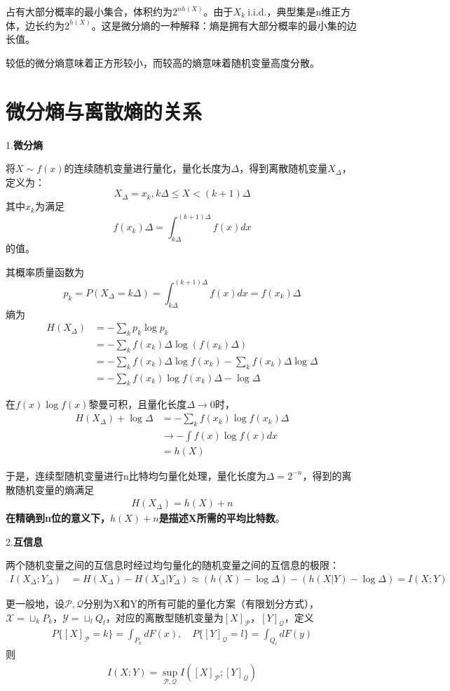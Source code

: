 \documentclass{ctexbook}
\begin{document}
占有大部分概率的最小集合，体积约为$2^{nh(X)}$。由于$X_k\ $i.i.d.，典型集是n维正方体，边长约为$2^{h(X)}$。这是微分熵的一种解释：熵是拥有大部分概率的最小集的边长值。

较低的微分熵意味着正方形较小，而较高的熵意味着随机变量高度分散。

\section{微分熵与离散熵的关系}

1.\textbf{微分熵}

将$X\sim f(x)$的连续随机变量进行量化，量化长度为$\Delta$，得到离散随机变量$X_\Delta$，定义为：
\[X_\Delta=x_k,k\Delta\leq X<(k+1)\Delta\]
其中$x_k$为满足
$$f(x_k)\Delta=\int_{k\Delta}^{(k+1)\Delta} f(x) dx$$
的值。

其概率质量函数为
\[p_k=P(X_\Delta = k\Delta) = \int_{k\Delta}^{(k+1)\Delta} f(x) dx=f(x_k)\Delta\]
熵为\begin{align*}
    H(X_\Delta)&=-\sum_{k} p_k \log p_k\\
    &=-\sum_{k} f(x_k)\Delta \log (f(x_k)\Delta)\\
    &=-\sum_{k} f(x_k)\Delta \log f(x_k)-\sum_{k} f(x_k)\Delta \log \Delta\\
    &=-\sum_{k} f(x_k) \log f(x_k)\Delta-\log \Delta
\end{align*}

在$f(x)\log f(x)$黎曼可积，且量化长度$\Delta\to 0$时，\begin{align*}
    H(X_\Delta)+\log \Delta&=-\sum_{k} f(x_k) \log f(x_k)\Delta\\
    &\to -\int f(x)\log f(x) dx\\
    &=h(X)
\end{align*}

于是，连续型随机变量进行n比特均匀量化处理，量化长度为$\Delta=2^{-n}$，得到的离散随机变量的熵满足\begin{align*}
    H(X_\Delta)=h(X)+n
\end{align*}
\textbf{在精确到n位的意义下，$h(X)+n$是描述X所需的平均比特数}。

2.\textbf{互信息}

两个随机变量之间的互信息时经过均匀量化的随机变量之间的互信息的极限：
\begin{align*}
    I(X_\Delta;Y_\Delta)&=H(X_\Delta)-H(X_\Delta|Y_\Delta)\approx (h(X)-\log\Delta)-(h(X|Y)-\log\Delta)=I(X;Y)
\end{align*}

更一般地，设$\mathcal{P},\mathcal{Q} $分别为X和Y的所有可能的量化方案（有限划分方式），$\mathcal{X} =\sqcup_k P_k$，$\mathcal{Y} =\sqcup_l Q_l$，对应的离散型随机变量为$[X]_{\mathcal{P}}$，$[Y]_{\mathcal{Q}}$，定义\begin{align*}
    P\{[X]_\mathcal{P} = k\}=\int_{P_k}dF(x),\quad P\{[Y]_\mathcal{Q} = l\}=\int_{Q_l}dF(y)
\end{align*}
    则\begin{align*}
    I(X;Y)=\sup_{\mathcal{P} ,\mathcal{Q} } I([X]_\mathcal{P};[Y]_\mathcal{Q})
\end{align*}
\end{document}
